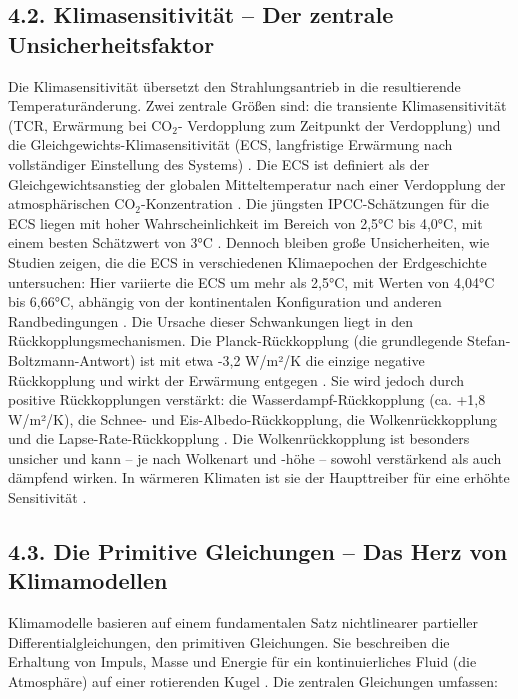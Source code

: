 \documentclass[12pt, a4paper]{article}
\begin{document}
	\subsection*{4.2. Klimasensitivität – Der zentrale Unsicherheitsfaktor}
	Die Klimasensitivität übersetzt den Strahlungsantrieb in die resultierende Temperaturänderung.
	Zwei zentrale Größen sind: die transiente Klimasensitivität (TCR, Erwärmung bei CO$_2$-
	Verdopplung zum Zeitpunkt der Verdopplung) und die Gleichgewichts-Klimasensitivität (ECS,
	langfristige Erwärmung nach vollständiger Einstellung des Systems) \cite{ipcc2021}.
	Die ECS
	ist definiert als der Gleichgewichtsanstieg der globalen Mitteltemperatur nach einer
	Verdopplung der atmosphärischen CO$_2$-Konzentration \cite{springer2026}.
	Die jüngsten IPCC-Schätzungen für die ECS liegen mit hoher Wahrscheinlichkeit im Bereich
	von 2,5°C bis 4,0°C, mit einem besten Schätzwert von 3°C \cite{ipcc2021, springer2024}.
	Dennoch bleiben große Unsicherheiten, wie Studien zeigen, die die ECS in verschiedenen
	Klimaepochen der Erdgeschichte untersuchen: Hier variierte die ECS um mehr als 2,5°C,
	mit Werten von 4,04°C bis 6,66°C, abhängig von der kontinentalen Konfiguration und
	anderen Randbedingungen \cite{springer2026}.
	Die Ursache dieser Schwankungen liegt in den Rückkopplungsmechanismen. Die Planck-Rückkopplung
	(die grundlegende Stefan-Boltzmann-Antwort) ist mit etwa -3,2 W/m²/K die einzige negative
	Rückkopplung und wirkt der Erwärmung entgegen \cite{springer2024}.
	Sie wird jedoch durch
	positive Rückkopplungen verstärkt: die Wasserdampf-Rückkopplung (ca. +1,8 W/m²/K), die
	Schnee- und Eis-Albedo-Rückkopplung, die Wolkenrückkopplung und die Lapse-Rate-Rückkopplung
	\cite{springer2026}.
	Die Wolkenrückkopplung ist besonders unsicher und kann – je nach
	Wolkenart und -höhe – sowohl verstärkend als auch dämpfend wirken.
	In wärmeren Klimaten
	ist sie der Haupttreiber für eine erhöhte Sensitivität \cite{springer2024}.
	
	\subsection*{4.3. Die Primitive Gleichungen – Das Herz von Klimamodellen}
	Klimamodelle basieren auf einem fundamentalen Satz nichtlinearer partieller
	Differentialgleichungen, den primitiven Gleichungen.
	Sie beschreiben die Erhaltung von
	Impuls, Masse und Energie für ein kontinuierliches Fluid (die Atmosphäre) auf einer
	rotierenden Kugel \cite{ictp2001}.
	Die zentralen Gleichungen umfassen:
	
\end{document}
